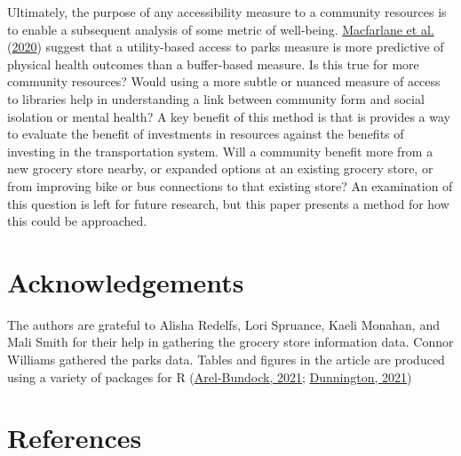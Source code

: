 \documentclass[3p, authoryear, review]{elsarticle} %
\begin{document}
Ultimately, the purpose of any accessibility measure to a community resources
is to enable a subsequent analysis of some metric of well-being. \protect\hyperlink{ref-macfarlane2020}{Macfarlane et al.} (\protect\hyperlink{ref-macfarlane2020}{2020})
suggest that a utility-based access to parks measure is more predictive of
physical health outcomes than a buffer-based measure. Is this true for more
community resources? Would using a more subtle or nuanced measure of access to
libraries help in understanding a link between community form and social isolation
or mental health? A key benefit of this method is that is provides a way to
evaluate the benefit of investments in resources against the benefits of investing
in the transportation system. Will a community benefit more from a new grocery store
nearby, or expanded options at an existing grocery store, or from improving bike
or bus connections to that existing store? An examination of this question is
left for future research, but this paper presents a method for how this could be
approached.

\hypertarget{acknowledgements}{%
\section*{Acknowledgements}\label{acknowledgements}}

The authors are grateful to Alisha Redelfs, Lori Spruance, Kaeli Monahan, and
Mali Smith for their help in gathering the grocery store information data.
Connor Williams gathered the parks data. Tables and figures in the article are
produced using a variety of packages for R (\protect\hyperlink{ref-modelsummary}{Arel-Bundock, 2021}; \protect\hyperlink{ref-ggspatial}{Dunnington, 2021})

\hypertarget{references}{%
\section*{References}\label{references}}
\end{document}

